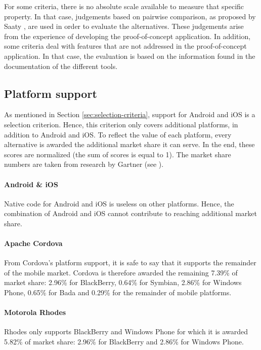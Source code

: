 For some criteria, there is no absolute scale available to measure that specific property. In that case, judgements based on pairwise comparison, as proposed by Saaty \cite{Saaty:1980}, are used in order to evaluate the alternatives. These judgements arise from the experience of developing the proof-of-concept application. In addition, some criteria deal with features that are not addressed in the proof-of-concept application. In that case, the evaluation is based on the information found in the documentation of the different tools. 


\subsection{Platform support}

As mentioned in Section \ref{sec:selection-criteria}, support for Android and iOS is a selection criterion. Hence, this criterion only covers additional platforms, in addition to Android and iOS. To reflect the value of each platform, every alternative is awarded the additional market share it can serve. In the end, these scores are normalized (the sum of scores is equal to 1). The market share numbers are taken from research by Gartner \citeGartner (see ).

\paragraph{Android \& iOS} Native code for Android and iOS is useless on other platforms. Hence, the combination of Android and iOS cannot contribute to reaching additional market share.

\paragraph{Apache Cordova} From Cordova's platform support, it is safe to say that it supports the remainder of the mobile market. Cordova is therefore awarded the remaining 7.39\% of market share: 2.96\% for BlackBerry, 0.64\% for Symbian, 2.86\% for Windows Phone, 0.65\% for Bada and 0.29\% for the remainder of mobile platforms.

\paragraph{Motorola Rhodes} Rhodes only supports BlackBerry and Windows Phone for which it is awarded 5.82\% of market share: 2.96\% for BlackBerry and 2.86\% for Windows Phone. 

